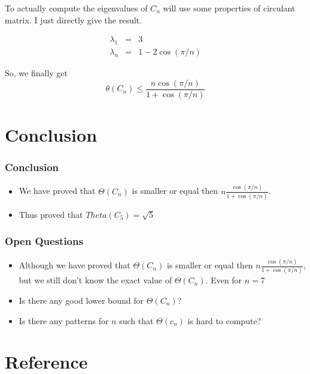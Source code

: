 \documentclass{beamer}
\begin{document}
                  \begin{frame}
                        To actually compute the eigenvalues of $C_{n}$ will use some properties of circulant matrix. 
                        I just directly give the result.

                        \begin{eqnarray}
                              \lambda_{1} &=& 3 \\
                              \lambda_{n} &=& 1 - 2\cos(\pi/n) 
                        \end{eqnarray}

                        So, we finally get
                        \begin{equation}
                              \theta(C_{n}) \le \frac{
                                    n \cos(\pi/n)
                              }{
                                    1+\cos(\pi/n)
                              }
                        \end{equation}
                  \end{frame}

      \section{Conclusion}

            \begin{frame}
                  \frametitle{Conclusion}
                  \begin{itemize}
                        \item We have proved that $\Theta(C_{n})$ is smaller or equal then $ n\frac{\cos(\pi/n)}{1+\cos(\pi/n)} $.
                        \item Thus proved that $Theta(C_{5}) = \sqrt{5}$
                  \end{itemize}
            \end{frame}

            \begin{frame}
                  \frametitle{Open Questions}
                  \begin{itemize}
                        \item Although we have proved that $\Theta(C_{n})$ is smaller or equal then $ n\frac{\cos(\pi/n)}{1+\cos(\pi/n)} $, but we still don't know the exact value of $\Theta(C_{n})$. Even for $n=7$
                        \item Is there any good lower bound for $\Theta(C_{n})$?
                        \item Is there any patterns for $n$ such that $\Theta(c_{n})$ is hard to compute?
                  \end{itemize}
            \end{frame}

      \section{Reference}
\end{document}
